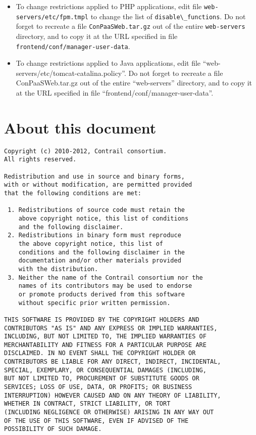 \documentclass[10pt]{article}
\begin{document}
\begin{itemize}
\item To change restrictions applied to PHP applications, edit file
  \verb+web-servers/etc/fpm.tmpl+ to change the list of
  \verb+disable\_functions+. Do not forget to recreate a file
  \verb+ConPaaSWeb.tar.gz+ out of the entire \verb+web-servers+
  directory, and to copy it at the URL specified in file
  \verb+frontend/conf/manager-user-data+.
\item To change restrictions applied to Java applications, edit file
  ``web-servers/etc/tomcat-catalina.policy''. Do not forget to
  recreate a file ConPaaSWeb.tar.gz out of the entire ``web-servers''
  directory, and to copy it at the URL specified in file
  ``frontend/conf/manager-user-data''.
\end{itemize}

\section{About this document}
\label{sec:about}


\begin{verbatim}
Copyright (c) 2010-2012, Contrail consortium.
All rights reserved.

Redistribution and use in source and binary forms, 
with or without modification, are permitted provided
that the following conditions are met:

 1. Redistributions of source code must retain the
    above copyright notice, this list of conditions
    and the following disclaimer.
 2. Redistributions in binary form must reproduce
    the above copyright notice, this list of 
    conditions and the following disclaimer in the
    documentation and/or other materials provided
    with the distribution.
 3. Neither the name of the Contrail consortium nor the
    names of its contributors may be used to endorse
    or promote products derived from this software 
    without specific prior written permission.

THIS SOFTWARE IS PROVIDED BY THE COPYRIGHT HOLDERS AND
CONTRIBUTORS "AS IS" AND ANY EXPRESS OR IMPLIED WARRANTIES,
INCLUDING, BUT NOT LIMITED TO, THE IMPLIED WARRANTIES OF
MERCHANTABILITY AND FITNESS FOR A PARTICULAR PURPOSE ARE
DISCLAIMED. IN NO EVENT SHALL THE COPYRIGHT HOLDER OR
CONTRIBUTORS BE LIABLE FOR ANY DIRECT, INDIRECT, INCIDENTAL,
SPECIAL, EXEMPLARY, OR CONSEQUENTIAL DAMAGES (INCLUDING, 
BUT NOT LIMITED TO, PROCUREMENT OF SUBSTITUTE GOODS OR 
SERVICES; LOSS OF USE, DATA, OR PROFITS; OR BUSINESS 
INTERRUPTION) HOWEVER CAUSED AND ON ANY THEORY OF LIABILITY,
WHETHER IN CONTRACT, STRICT LIABILITY, OR TORT
(INCLUDING NEGLIGENCE OR OTHERWISE) ARISING IN ANY WAY OUT
OF THE USE OF THIS SOFTWARE, EVEN IF ADVISED OF THE
POSSIBILITY OF SUCH DAMAGE.
\end{verbatim}
\end{document}
